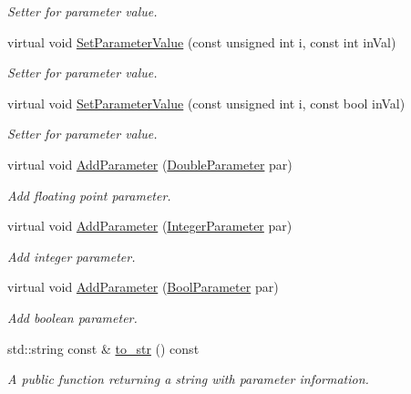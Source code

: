 \begin{DoxyCompactItemize}
\begin{DoxyCompactList}\small\item\em Setter for parameter value. \end{DoxyCompactList}\item 
virtual void \hyperlink{class_parameter_list_afefffdda9cf6dfd97a519baa0e1f6e5b}{Set\-Parameter\-Value} (const unsigned int i, const int in\-Val)
\begin{DoxyCompactList}\small\item\em Setter for parameter value. \end{DoxyCompactList}\item 
virtual void \hyperlink{class_parameter_list_a41192da59a56f939d1149a00cadfc6b3}{Set\-Parameter\-Value} (const unsigned int i, const bool in\-Val)
\begin{DoxyCompactList}\small\item\em Setter for parameter value. \end{DoxyCompactList}\item 
virtual void \hyperlink{class_parameter_list_a0d5088fbb4fb10a3efea998d1aeee1a3}{Add\-Parameter} (\hyperlink{class_double_parameter}{Double\-Parameter} par)
\begin{DoxyCompactList}\small\item\em Add floating point parameter. \end{DoxyCompactList}\item 
virtual void \hyperlink{class_parameter_list_a817d794256d9f2e0f38535c264b2761b}{Add\-Parameter} (\hyperlink{class_integer_parameter}{Integer\-Parameter} par)
\begin{DoxyCompactList}\small\item\em Add integer parameter. \end{DoxyCompactList}\item 
virtual void \hyperlink{class_parameter_list_a7fb0ec39de4c17fd0a9d3805673007d4}{Add\-Parameter} (\hyperlink{class_bool_parameter}{Bool\-Parameter} par)
\begin{DoxyCompactList}\small\item\em Add boolean parameter. \end{DoxyCompactList}\item 
std\-::string const \& \hyperlink{class_parameter_list_a9ea8f819a48dd707785e2db937736bd5}{to\-\_\-str} () const 
\begin{DoxyCompactList}\small\item\em A public function returning a string with parameter information. \end{DoxyCompactList}\end{DoxyCompactItemize}
